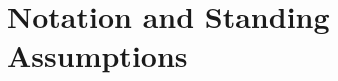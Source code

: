 \documentclass[12pt]{amsart}
\numberwithin{equation}{section}
\begin{document}

\section*{Notation and Standing Assumptions}
\end{document}
